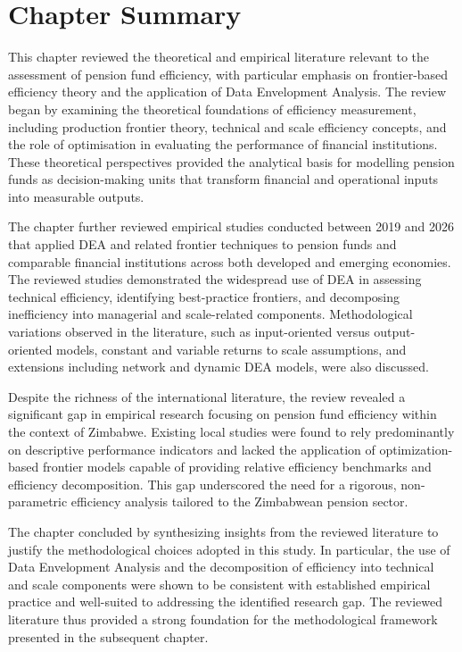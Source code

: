 \documentclass[12pt,a4paper]{article}
\begin{document}
\section{Chapter Summary}

This chapter reviewed the theoretical and empirical literature relevant to the assessment of pension fund efficiency, with particular emphasis on frontier-based efficiency theory and the application of Data Envelopment Analysis. The review began by examining the theoretical foundations of efficiency measurement, including production frontier theory, technical and scale efficiency concepts, and the role of optimisation in evaluating the performance of financial institutions. These theoretical perspectives provided the analytical basis for modelling pension funds as decision-making units that transform financial and operational inputs into measurable outputs.

The chapter further reviewed empirical studies conducted between 2019 and 2026 that applied DEA and related frontier techniques to pension funds and comparable financial institutions across both developed and emerging economies. The reviewed studies demonstrated the widespread use of DEA in assessing technical efficiency, identifying best-practice frontiers, and decomposing inefficiency into managerial and scale-related components. Methodological variations observed in the literature, such as input-oriented versus output-oriented models, constant and variable returns to scale assumptions, and extensions including network and dynamic DEA models, were also discussed.

Despite the richness of the international literature, the review revealed a significant gap in empirical research focusing on pension fund efficiency within the context of Zimbabwe. Existing local studies were found to rely predominantly on descriptive performance indicators and lacked the application of optimization-based frontier models capable of providing relative efficiency benchmarks and efficiency decomposition. This gap underscored the need for a rigorous, non-parametric efficiency analysis tailored to the Zimbabwean pension sector.

The chapter concluded by synthesizing insights from the reviewed literature to justify the methodological choices adopted in this study. In particular, the use of Data Envelopment Analysis and the decomposition of efficiency into technical and scale components were shown to be consistent with established empirical practice and well-suited to addressing the identified research gap. The reviewed literature thus provided a strong foundation for the methodological framework presented in the subsequent chapter.
\end{document}
